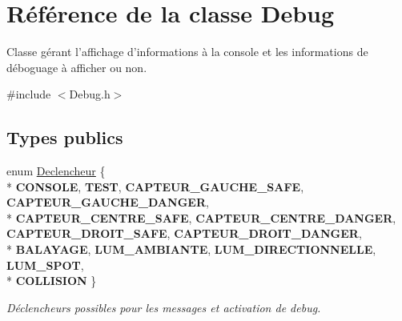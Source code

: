 \hypertarget{class_debug}{\section{Référence de la classe Debug}
\label{class_debug}
}


Classe gérant l'affichage d'informations à la console et les informations de déboguage à afficher ou non.  




{\ttfamily \#include $<$Debug.\-h$>$}

\subsection*{Types publics}
\begin{DoxyCompactItemize}
\item 
enum \hyperlink{class_debug_afd6ed3c50c08d0a7830cd5253b4ab8b6}{Declencheur} \{ \\*
{\bfseries C\-O\-N\-S\-O\-L\-E}, 
{\bfseries T\-E\-S\-T}, 
{\bfseries C\-A\-P\-T\-E\-U\-R\-\_\-\-G\-A\-U\-C\-H\-E\-\_\-\-S\-A\-F\-E}, 
{\bfseries C\-A\-P\-T\-E\-U\-R\-\_\-\-G\-A\-U\-C\-H\-E\-\_\-\-D\-A\-N\-G\-E\-R}, 
\\*
{\bfseries C\-A\-P\-T\-E\-U\-R\-\_\-\-C\-E\-N\-T\-R\-E\-\_\-\-S\-A\-F\-E}, 
{\bfseries C\-A\-P\-T\-E\-U\-R\-\_\-\-C\-E\-N\-T\-R\-E\-\_\-\-D\-A\-N\-G\-E\-R}, 
{\bfseries C\-A\-P\-T\-E\-U\-R\-\_\-\-D\-R\-O\-I\-T\-\_\-\-S\-A\-F\-E}, 
{\bfseries C\-A\-P\-T\-E\-U\-R\-\_\-\-D\-R\-O\-I\-T\-\_\-\-D\-A\-N\-G\-E\-R}, 
\\*
{\bfseries B\-A\-L\-A\-Y\-A\-G\-E}, 
{\bfseries L\-U\-M\-\_\-\-A\-M\-B\-I\-A\-N\-T\-E}, 
{\bfseries L\-U\-M\-\_\-\-D\-I\-R\-E\-C\-T\-I\-O\-N\-N\-E\-L\-L\-E}, 
{\bfseries L\-U\-M\-\_\-\-S\-P\-O\-T}, 
\\*
{\bfseries C\-O\-L\-L\-I\-S\-I\-O\-N}
 \}
\begin{DoxyCompactList}\small\item\em Déclencheurs possibles pour les messages et activation de debug. \end{DoxyCompactList}\end{DoxyCompactItemize}
